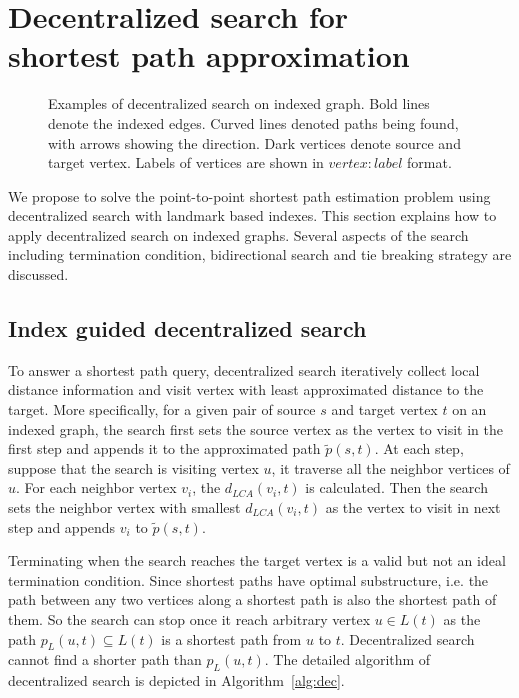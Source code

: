 \section{Decentralized search for \\ shortest path approximation}
\label{searching}

\begin{figure*}[ht]
    \centering
    \caption{Examples of decentralized search on indexed graph. Bold lines denote the indexed edges. Curved lines denoted paths being found, with arrows showing the direction. Dark vertices denote source and target vertex. Labels of vertices are shown in $vertex:label$ format.}
\end{figure*}

We propose to solve the point-to-point shortest path estimation problem using decentralized search with landmark based indexes. This section explains how to apply decentralized search on indexed graphs. Several aspects of the search including termination condition, bidirectional search and tie breaking strategy are discussed. 

\subsection{Index guided decentralized search}

To answer a shortest path query, decentralized search iteratively collect local distance information and visit vertex with least approximated distance to the target. More specifically, for a given pair of source $s$ and target vertex $t$ on an indexed graph, the search first sets the source vertex as the vertex to visit in the first step and appends it to the approximated path $\tilde{p}(s,t)$. At each step, suppose that the search is visiting vertex $u$, it traverse all the neighbor vertices of $u$. For each neighbor vertex $v_i$, the $d_{LCA}(v_i,t)$ is calculated. Then the search sets the neighbor vertex with smallest $d_{LCA}(v_i,t)$ as the vertex to visit in next step and appends $v_i$ to $\tilde{p}(s,t)$. 
 
Terminating when the search reaches the target vertex is a valid but not an ideal termination condition. Since shortest paths have optimal substructure, i.e. the path between any two vertices along a shortest path is also the shortest path of them. So the search can stop once it reach arbitrary vertex $u \in L(t)$ as the path $p_L(u,t) \subseteq L(t)$ is a shortest path from $u$ to $t$. Decentralized search cannot find a shorter path than $p_L(u,t)$. The detailed algorithm of decentralized search is depicted in Algorithm~\ref{alg:dec}.


